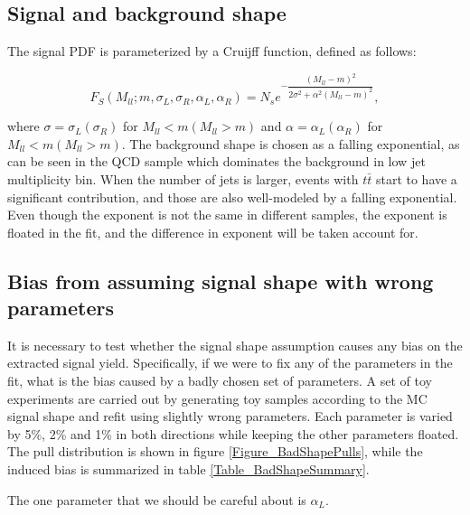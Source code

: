 \documentclass{cmspaper}
\begin{document}
\subsection{Signal and background shape}

The signal PDF is parameterized by a Cruijff function, defined as follows:

\begin{equation}
F_S(M_{ll}; m, \sigma_L, \sigma_R, \alpha_L, \alpha_R) = N_s e^{-\dfrac{(M_{ll} - m)^2}{2 \sigma^2 + \alpha^2 (M_{ll} - m)^2}},\nonumber
\end{equation}

where $\sigma = \sigma_L (\sigma_R)$ for $M_{ll} < m (M_{ll} > m)$ and $\alpha = \alpha_L (\alpha_R)$ for $M_{ll} < m (M_{ll} > m)$.
The background shape is chosen as a falling exponential, as can be seen in the QCD sample which dominates the background in low
jet multiplicity bin.  When the number of jets is larger, events with $t\bar{t}$ start to have a significant contribution, and those are
also well-modeled by a falling exponential.
Even though the exponent is not the same in different samples, the exponent is floated in the fit, and the difference in exponent will be taken account for.

\subsection{Bias from assuming signal shape with wrong parameters}

It is necessary to test whether the signal shape assumption causes any bias on the extracted signal yield.
Specifically, if we were to fix any of the parameters in the fit, what is the bias caused by a badly chosen set of parameters.
A set of toy experiments are carried out by generating toy samples according to the MC signal shape and refit using slightly wrong parameters.
Each parameter is varied by 5\%, 2\% and 1\% in both directions while keeping the other parameters floated.
The pull distribution is shown in figure \ref{Figure_BadShapePulls}, while the induced bias is summarized in table \ref{Table_BadShapeSummary}.

The one parameter that we should be careful about is $\alpha_L$.
\end{document}
